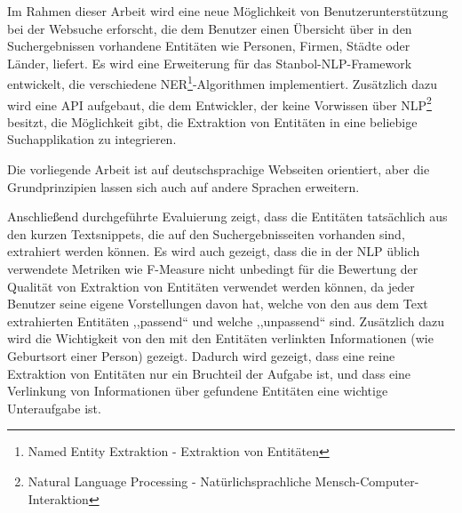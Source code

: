 Im Rahmen dieser Arbeit wird eine neue Möglichkeit von Benutzerunterstützung bei der Websuche erforscht, die dem Benutzer einen Übersicht über in den Suchergebnissen vorhandene Entitäten wie Personen, Firmen, Städte oder Länder, liefert. Es wird eine Erweiterung für das Stanbol-NLP-Framework entwickelt, die verschiedene NER\footnote{Named Entity Extraktion - Extraktion von Entitäten}-Algorithmen implementiert. Zusätzlich dazu wird eine API aufgebaut, die dem Entwickler, der keine Vorwissen über NLP\footnote{Natural Language Processing - Natürlichsprachliche Mensch-Computer-Interaktion} besitzt, die Möglichkeit gibt, die Extraktion von Entitäten in eine beliebige Suchapplikation zu integrieren. 

Die vorliegende Arbeit ist auf deutschsprachige Webseiten orientiert, aber die Grundprinzipien lassen sich auch auf andere Sprachen erweitern.

Anschließend durchgeführte Evaluierung zeigt, dass die Entitäten tatsächlich aus den kurzen Textsnippets, die auf den Suchergebnisseiten vorhanden sind, extrahiert werden können. Es wird auch gezeigt, dass die in der NLP üblich verwendete Metriken wie F-Measure nicht unbedingt für die Bewertung der Qualität von Extraktion von Entitäten verwendet werden können, da jeder Benutzer seine eigene Vorstellungen davon hat, welche von den aus dem Text extrahierten Entitäten ,,passend`` und welche ,,unpassend`` sind. Zusätzlich dazu wird die Wichtigkeit von den mit den Entitäten verlinkten Informationen (wie Geburtsort einer Person) gezeigt. Dadurch wird gezeigt, dass eine reine Extraktion von Entitäten nur ein Bruchteil der Aufgabe ist, und dass eine Verlinkung von Informationen über gefundene Entitäten eine wichtige Unteraufgabe ist.